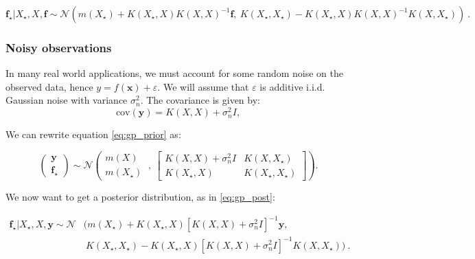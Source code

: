 \documentclass{article}
\begin{document}
	\begin{equation} \label{eq:gp_post}
		\mathbf{f}_\star | X_\star,X,\mathbf{f} \sim \mathcal{N} (m(X_\star) + K(X_\star,X)K(X,X)^{-1} \mathbf{f}, \ K(X_\star,X_\star) - K(X_\star,X)K(X,X)^{-1}K(X,X_\star)) \ .
	\end{equation}
	
	\subsubsection{Noisy observations}
	In many real world applications, we must account for some random noise on the observed data, hence $y = f(\mathbf{x}) + \varepsilon$. We will assume that $\varepsilon$ is additive i.i.d. Gaussian noise with variance $\sigma^2_n$. The covariance is given by:
	\begin{equation}
		\text{cov}(\mathbf{y}) = K(X,X) + \sigma^2_n I,
	\end{equation}
	
	We can rewrite equation \eqref{eq:gp_prior} as:
	
	\begin{equation}
		\begin{pmatrix}
			\mathbf{y} \\
			\mathbf{f}_\star
		\end{pmatrix} 
		\sim \mathcal{N} \left(
		\begin{matrix}
			m(X) \\
			m(X_\star)
		\end{matrix} \ , \ 
		\begin{bmatrix}
			K(X,X) + \sigma_n^2I & K(X,X_\star) \\
			K(X_\star,X) & K(X_\star,X_\star)
		\end{bmatrix} \right).
	\end{equation}
	
	We now want to get a posterior distribution, as in \eqref{eq:gp_post}:
	
	\begin{equation} \label{eq:gp_noisy_post}
		\begin{split}   
			\mathbf{f}_\star | X_\star,X,\mathbf{y} \sim \mathcal{N} & (m(X_\star) + K(X_\star,X)[K(X,X) + \sigma^2_n I]^{-1} \mathbf{y}, \\
			& \ K(X_\star,X_\star) - K(X_\star,X) [K(X,X) + \sigma^2_n I]^{-1} K(X,X_\star)) \ .
		\end{split}
	\end{equation}
	
\end{document}
